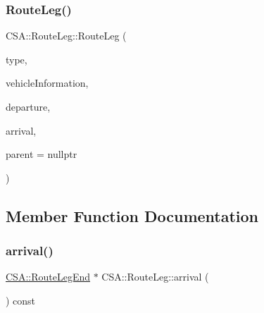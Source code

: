 \subsubsection{\texorpdfstring{Route\+Leg()}{RouteLeg()}}
{\footnotesize\ttfamily C\+S\+A\+::\+Route\+Leg\+::\+Route\+Leg (\begin{DoxyParamCaption}\item[{const \mbox{\hyperlink{classCSA_1_1RouteLeg_a464547cf160a77a2014d101560b1f77b}{C\+S\+A\+::\+Route\+Leg\+::\+Type}} \&}]{type,  }\item[{\mbox{\hyperlink{classCSA_1_1Vehicle}{C\+S\+A\+::\+Vehicle}} $\ast$}]{vehicle\+Information,  }\item[{\mbox{\hyperlink{classCSA_1_1RouteLegEnd}{C\+S\+A\+::\+Route\+Leg\+End}} $\ast$}]{departure,  }\item[{\mbox{\hyperlink{classCSA_1_1RouteLegEnd}{C\+S\+A\+::\+Route\+Leg\+End}} $\ast$}]{arrival,  }\item[{Q\+Object $\ast$}]{parent = {\ttfamily nullptr} }\end{DoxyParamCaption})\hspace{0.3cm}{\ttfamily [explicit]}}



\subsection{Member Function Documentation}
\mbox{\label{classCSA_1_1RouteLeg_a096f128bcfa0e616bfab643f5b2c245f}} 
\subsubsection{\texorpdfstring{arrival()}{arrival()}}
{\footnotesize\ttfamily \mbox{\hyperlink{classCSA_1_1RouteLegEnd}{C\+S\+A\+::\+Route\+Leg\+End}} $\ast$ C\+S\+A\+::\+Route\+Leg\+::arrival (\begin{DoxyParamCaption}{ }\end{DoxyParamCaption}) const}

\mbox{\label{classCSA_1_1RouteLeg_a1163b0c9b0b0020677776c576b2fd73b}} 
